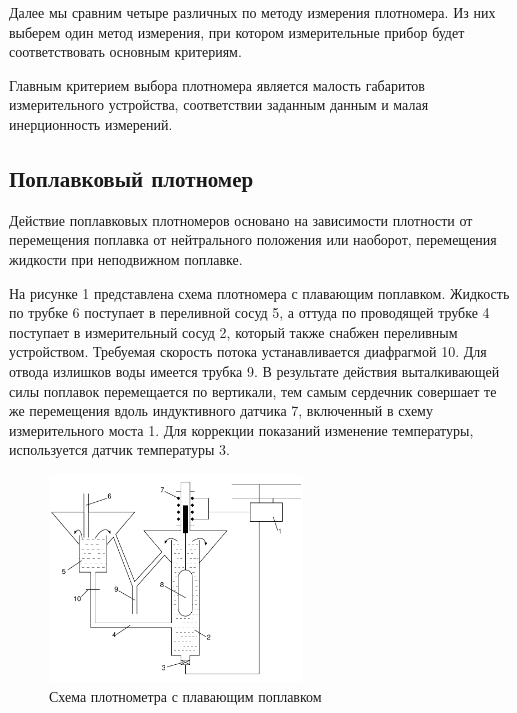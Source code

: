 \documentclass[russian, utf8, 12pt]{eskdtext}
\begin{document}
Далее мы сравним четыре различных по методу измерения плотномера. Из них выберем один метод измерения, при котором измерительные прибор будет соответствовать основным критериям. \par

Главным критерием выбора плотномера является малость габаритов измерительного устройства, соответствии заданным данным и малая инерционность измерений. \par

\subsection{Поплавковый плотномер}

Действие поплавковых плотномеров основано на зависимости плотности от перемещения поплавка от нейтрального положения или наоборот, перемещения жидкости при неподвижном поплавке. \par

На рисунке 1 представлена схема плотномера с плавающим поплавком. Жидкость по трубке 6 поступает в переливной сосуд 5, а оттуда по проводящей трубке 4 поступает в измерительный сосуд 2, который также снабжен переливным устройством. Требуемая скорость потока устанавливается диафрагмой 10. Для отвода излишков воды имеется трубка 9. В результате действия выталкивающей силы поплавок перемещается по вертикали, тем самым сердечник совершает те же перемещения вдоль индуктивного датчика 7, включенный в схему измерительного моста 1. Для коррекции показаний изменение температуры, используется датчик температуры 3. \par 

\begin{figure}[h!]
	\centering
	\includegraphics[width = 0.6\textwidth] {FloatDensityMeter.pdf}
	\caption{Схема плотнометра с плавающим поплавком}
\end{figure}
\end{document}
